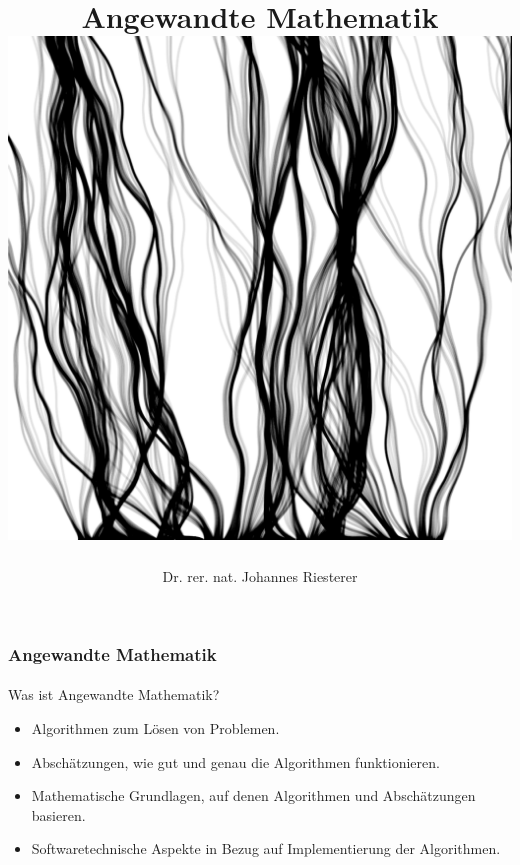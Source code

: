 \documentclass{beamer}
\begin{document}
\title[Angewandte Mathematik] %
{Angewandte Mathematik
\\
\includegraphics[scale=0.15]{images/cover}
}
\subtitle{}
\author[Dr. Johannes Riesterer] %
{Dr.  rer. nat. Johannes Riesterer}

\date[KPT 2004] %
{}

\subject{Angewandte Mathematik}

\frame{\titlepage}

\begin{frame}
    \frametitle{Angewandte Mathematik}
\framesubtitle{}
    \begin{block}{Was ist Angewandte Mathematik?}
\begin{itemize}
\pause \item Algorithmen zum Lösen von Problemen.
\pause \item Abschätzungen, wie gut und genau die Algorithmen funktionieren.
\pause \item Mathematische Grundlagen, auf denen Algorithmen und Abschätzungen basieren. 
\pause \item Softwaretechnische Aspekte in Bezug auf  Implementierung der Algorithmen.
\end{itemize}
\end{block}
 \end{frame}
\end{document}
